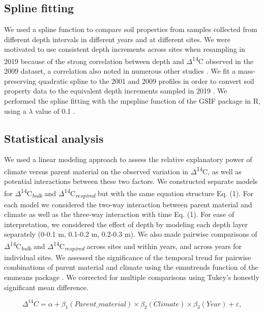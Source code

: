 \documentclass[soil, manuscript]{copernicus}
\begin{document}
\subsection{Spline fitting}

We used a spline function to compare soil properties from samples
collected from different depth intervals in different years and at
different sites. We were motivated to use consistent depth increments
across sites when resampling in 2019 because of the strong correlation
between depth and \(\Delta\)\textsuperscript{14}C observed in the 2009
dataset, a correlation also noted in numerous other studies
\citep{mathieu2015, shi2020}. We fit a mass-preserving quadratic spline
to the 2001 and 2009 profiles in order to convert soil property data to
the equivalent depth increments sampled in 2019 \citep{bishop1999}. We
performed the spline fitting with the mpspline function of the GSIF
package in R, using a \(\lambda\) value of 0.1 \citep{hengl2019}.

\subsection{Statistical analysis}

We used a linear modeling approach to assess the relative explanatory
power of climate versus parent material on the observed variation in
\(\Delta\)\textsuperscript{14}C, as well as potential interactions
between these two factors. We constructed separate models for
\(\Delta\)\textsuperscript{14}C\textsubscript{\emph{bulk}} and
\(\Delta\)\textsuperscript{14}C\textsubscript{\emph{respired}} but with
the same equation structure Eq. (1). For each model we considered the
two-way interaction between parent material and climate as well as the
three-way interaction with time Eq. (1). For ease of interpretation, we
considered the effect of depth by modeling each depth layer separately
(0-0.1 m, 0.1-0.2 m, 0.2-0.3 m). We also made pairwise comparisons of
\(\Delta\)\textsuperscript{14}C\textsubscript{\emph{bulk}} and
\(\Delta\)\textsuperscript{14}C\textsubscript{\emph{respired}} across
sites and within years, and across years for individual sites. We
assessed the significance of the temporal trend for pairwise
combinations of parent material and climate using the emmtrends function
of the emmeans package \citep{lenth2021}. We corrected for multiple
comparisons using Tukey's honestly significant mean difference.

\begin{equation}
\Delta^{14}C = \alpha + \beta_{1}(Parent\_material) \times \beta_{2}(Climate) \times \beta_{3}(Year) + \varepsilon,
\end{equation}
\end{document}
